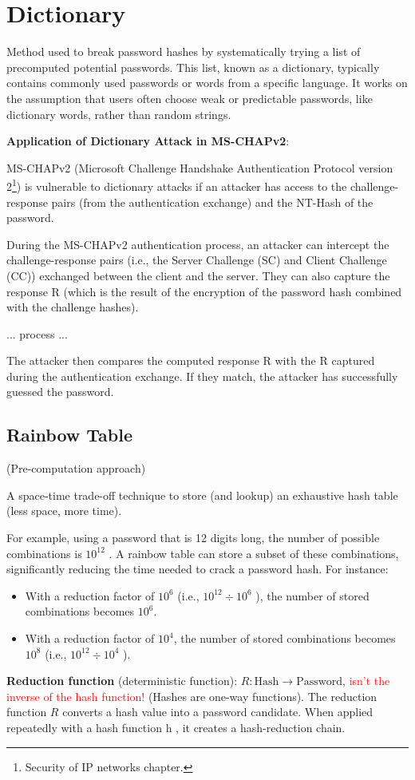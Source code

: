 \centering
\section{Dictionary}
\raggedright
Method used to break password hashes by systematically trying a list of precomputed potential passwords. This list, known as a dictionary, typically contains commonly used passwords or words from a specific language. It works on the assumption that users often choose weak or predictable passwords, like dictionary words, rather than random strings.

\hfill

\textbf{Application of Dictionary Attack in MS-CHAPv2}:

MS-CHAPv2 (Microsoft Challenge Handshake Authentication Protocol version 2\footnote{Security of IP networks chapter.}) is vulnerable to dictionary attacks if an attacker has access to the challenge-response pairs (from the authentication exchange) and the NT-Hash of the password.

During the MS-CHAPv2 authentication process, an attacker can intercept the challenge-response pairs (i.e., the Server Challenge (SC) and Client Challenge (CC)) exchanged between the client and the server. They can also capture the response R (which is the result of the encryption of the password hash combined with the challenge hashes).

... process ... 

The attacker then compares the computed response R with the R captured during the authentication exchange. If they match, the attacker has successfully guessed the password.

\begin{center}
    \subsection{Rainbow Table}
    (Pre-computation approach)
\end{center}

A space-time trade-off technique to store (and lookup) an exhaustive hash table (less space, more time). 

For example, using a password that is 12 digits long, the number of possible combinations is  $10^{12}$ . A rainbow table can store a subset of these combinations, significantly reducing the time needed to crack a password hash. For instance:
\begin{itemize}
    \item With a reduction factor of  $10^6$  (i.e.,  $10^{12} \div 10^6$ ), the number of stored combinations becomes $10^6$.
    \item With a reduction factor of  $10^4$, the number of stored combinations becomes  $10^8$  (i.e.,  $10^{12} \div 10^4$ ).
\end{itemize}
\textbf{Reduction function} (deterministic function): \( R: \text{Hash} \rightarrow \text{Password} \), \textcolor{Red}{isn't the inverse of the hash function!} (Hashes are one-way functions). The reduction function  $R$  converts a hash value into a password candidate. When applied repeatedly with a hash function  h , it creates a hash-reduction chain.

